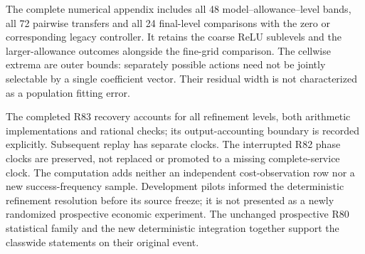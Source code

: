 The complete numerical appendix includes all 48 model--allowance--level bands, all 72 pairwise transfers and all 24 final-level comparisons with the zero or corresponding legacy controller. It retains the coarse ReLU sublevels and the larger-allowance outcomes alongside the fine-grid comparison. The cellwise extrema are outer bounds: separately possible actions need not be jointly selectable by a single coefficient vector. Their residual width is not characterized as a population fitting error.


The completed R83 recovery accounts for all refinement levels, both arithmetic implementations and rational checks; its output-accounting boundary is recorded explicitly. Subsequent replay has separate clocks. The interrupted R82 phase clocks are preserved, not replaced or promoted to a missing complete-service clock. The computation adds neither an independent cost-observation row nor a new success-frequency sample. Development pilots informed the deterministic refinement resolution before its source freeze; it is not presented as a newly randomized prospective economic experiment. The unchanged prospective R80 statistical family and the new deterministic integration together support the classwide statements on their original event.

